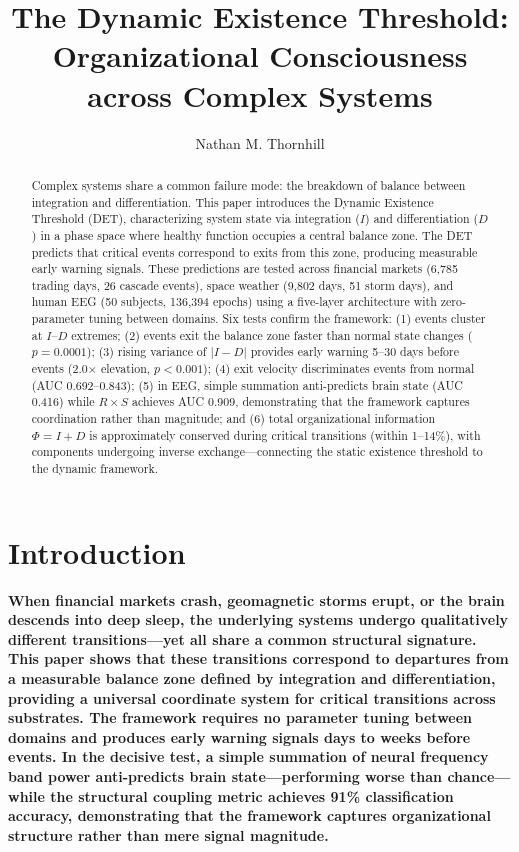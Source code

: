 \documentclass[aip,cha,reprint,amsmath,amssymb,final,floatfix]{revtex4-2}
\begin{document}
\title{The Dynamic Existence Threshold: Organizational Consciousness across Complex Systems}
\author{Nathan M. Thornhill}

\begin{abstract}
Complex systems share a common failure mode: the breakdown of balance between integration and differentiation. This paper introduces the Dynamic Existence Threshold (DET), characterizing system state via integration ($I$) and differentiation ($D$) in a phase space where healthy function occupies a central balance zone. The DET predicts that critical events correspond to exits from this zone, producing measurable early warning signals. These predictions are tested across financial markets (6,785 trading days, 26 cascade events), space weather (9,802 days, 51 storm days), and human EEG (50 subjects, 136,394 epochs) using a five-layer architecture with zero-parameter tuning between domains. Six tests confirm the framework: (1) events cluster at $I$--$D$ extremes; (2) events exit the balance zone faster than normal state changes ($p = 0.0001$); (3) rising variance of $|I - D|$ provides early warning 5--30 days before events (2.0$\times$ elevation, $p < 0.001$); (4) exit velocity discriminates events from normal (AUC 0.692--0.843); (5) in EEG, simple summation anti-predicts brain state (AUC 0.416) while $R \times S$ achieves AUC 0.909, demonstrating that the framework captures coordination rather than magnitude; and (6) total organizational information $\Phi = I + D$ is approximately conserved during critical transitions (within 1--14\%), with components undergoing inverse exchange---connecting the static existence threshold to the dynamic framework.
\end{abstract}
\maketitle

\section{Introduction}

\textbf{When financial markets crash, geomagnetic storms erupt, or the brain descends into deep sleep, the underlying systems undergo qualitatively different transitions---yet all share a common structural signature. This paper shows that these transitions correspond to departures from a measurable balance zone defined by integration and differentiation, providing a universal coordinate system for critical transitions across substrates. The framework requires no parameter tuning between domains and produces early warning signals days to weeks before events. In the decisive test, a simple summation of neural frequency band power anti-predicts brain state---performing worse than chance---while the structural coupling metric achieves 91\% classification accuracy, demonstrating that the framework captures organizational structure rather than mere signal magnitude.}
\end{document}
